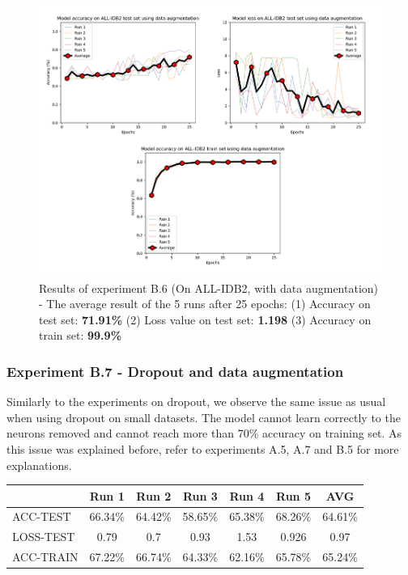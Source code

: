\documentclass[11pt, openany]{report}
\theoremstyle{plain}
\theoremstyle{definition}
\theoremstyle{remark}
\begin{document}
\begin{figure}[H]
  \centering
  \includegraphics[scale=0.45]{Code/ch6-LeukemiaSubtypes/figures_result/ALL_IDB2/all_idb2-data_aug.PNG}
  \caption{Results of experiment B.6 (On ALL-IDB2, with data augmentation) - The average result of the 5 runs after 25 epochs: (1) Accuracy on test set: \textbf{71.91\%} (2) Loss value on test set: \textbf{1.198} (3) Accuracy on train set: \textbf{99.9\%}}
  \label{fig:results-B6}
\end{figure}


\subsubsection{Experiment B.7 - Dropout and data augmentation}

Similarly to the experiments on dropout, we observe the same issue as usual when using dropout on small datasets. The model cannot learn correctly to the neurons removed and cannot reach more than 70\% accuracy on training set. As this issue was explained before, refer to experiments A.5, A.7 and B.5 for more explanations. 

\begin{center}
\begin{tabular}{|l|c|c|c|c|c|c|}
  \hline
   & \textbf{Run 1} & \textbf{Run 2} & \textbf{Run 3} & \textbf{Run 4} & \textbf{Run 5} & \textbf{AVG}\\
  \hline
  ACC-TEST & 66.34\% & 64.42\% & 58.65\% & 65.38\% & 68.26\% & 64.61\% \\
  LOSS-TEST & 0.79 & 0.7 & 0.93 & 1.53 & 0.926 & 0.97 \\ 
  ACC-TRAIN & 67.22\% & 66.74\% & 64.33\% & 62.16\% & 65.78\% & 65.24\% \\ 
  \hline
\end{tabular}
\label{table:results-B7}
\end{center}
\end{document}
